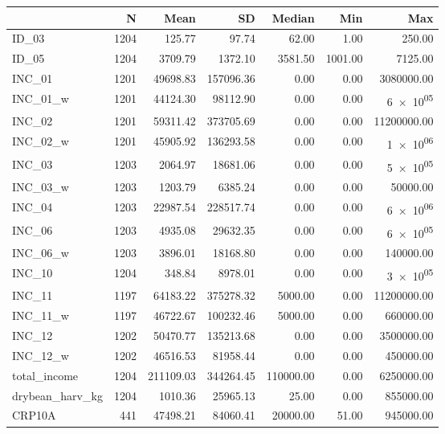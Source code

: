 \begin{table}
\centering
\begin{tabular}[t]{lrrrrrr}
\toprule
  & N & Mean & SD & Median & Min & Max\\
\midrule
ID\_03 & 1204 & \num{125.77} & \num{97.74} & \num{62.00} & \num{1.00} & \num{250.00}\\
ID\_05 & 1204 & \num{3709.79} & \num{1372.10} & \num{3581.50} & \num{1001.00} & \num{7125.00}\\
INC\_01 & 1201 & \num{49698.83} & \num{157096.36} & \num{0.00} & \num{0.00} & \num{3080000.00}\\
INC\_01\_w & 1201 & \num{44124.30} & \num{98112.90} & \num{0.00} & \num{0.00} & \num{6e+05}\\
INC\_02 & 1201 & \num{59311.42} & \num{373705.69} & \num{0.00} & \num{0.00} & \num{11200000.00}\\
INC\_02\_w & 1201 & \num{45905.92} & \num{136293.58} & \num{0.00} & \num{0.00} & \num{1e+06}\\
INC\_03 & 1203 & \num{2064.97} & \num{18681.06} & \num{0.00} & \num{0.00} & \num{5e+05}\\
INC\_03\_w & 1203 & \num{1203.79} & \num{6385.24} & \num{0.00} & \num{0.00} & \num{50000.00}\\
INC\_04 & 1203 & \num{22987.54} & \num{228517.74} & \num{0.00} & \num{0.00} & \num{6e+06}\\
INC\_06 & 1203 & \num{4935.08} & \num{29632.35} & \num{0.00} & \num{0.00} & \num{6e+05}\\
INC\_06\_w & 1203 & \num{3896.01} & \num{18168.80} & \num{0.00} & \num{0.00} & \num{140000.00}\\
INC\_10 & 1204 & \num{348.84} & \num{8978.01} & \num{0.00} & \num{0.00} & \num{3e+05}\\
INC\_11 & 1197 & \num{64183.22} & \num{375278.32} & \num{5000.00} & \num{0.00} & \num{11200000.00}\\
INC\_11\_w & 1197 & \num{46722.67} & \num{100232.46} & \num{5000.00} & \num{0.00} & \num{660000.00}\\
INC\_12 & 1202 & \num{50470.77} & \num{135213.68} & \num{0.00} & \num{0.00} & \num{3500000.00}\\
INC\_12\_w & 1202 & \num{46516.53} & \num{81958.44} & \num{0.00} & \num{0.00} & \num{450000.00}\\
total\_income & 1204 & \num{211109.03} & \num{344264.45} & \num{110000.00} & \num{0.00} & \num{6250000.00}\\
drybean\_harv\_kg & 1204 & \num{1010.36} & \num{25965.13} & \num{25.00} & \num{0.00} & \num{855000.00}\\
CRP10A & 441 & \num{47498.21} & \num{84060.41} & \num{20000.00} & \num{51.00} & \num{945000.00}\\
\bottomrule
\end{tabular}
\end{table}
